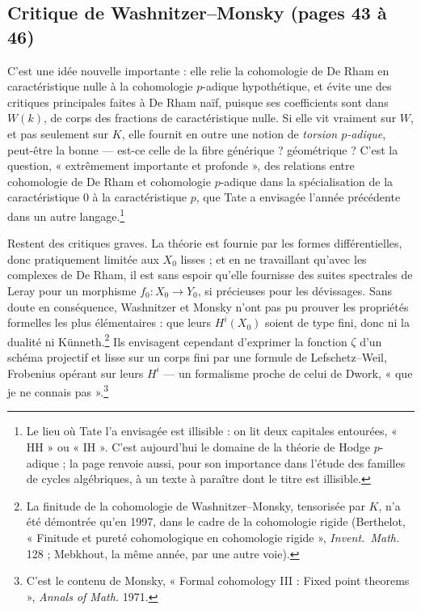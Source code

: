 \documentclass[11pt,a4paper]{article}
\begin{document}
\subsection*{Critique de Washnitzer--Monsky (pages 43 à 46)}

C'est une idée nouvelle importante : elle relie la cohomologie de De Rham en
caractéristique nulle à la cohomologie $p$-adique hypothétique, et évite une
des critiques principales faites à De Rham naïf, puisque ses coefficients
sont dans $W(k)$, de corps des fractions de caractéristique nulle. Si elle
vit vraiment sur $W$, et pas seulement sur $K$, elle fournit en outre une
notion de \emph{torsion $p$-adique}, peut-être la bonne — est-ce celle de la
fibre générique ? géométrique ? C'est la question, « extrêmement importante
et profonde », des relations entre cohomologie de De Rham et cohomologie
$p$-adique dans la spécialisation de la caractéristique $0$ à la
caractéristique $p$, que Tate a envisagée l'année précédente dans un autre
langage.\footnote{Le lieu où Tate l'a envisagée est illisible : on lit deux
capitales entourées, « HH » ou « IH ». C'est aujourd'hui le domaine de la
théorie de Hodge $p$-adique ; la page renvoie aussi, pour son importance dans
l'étude des familles de cycles algébriques, à un texte à paraître dont le
titre est illisible.}

Restent des critiques graves. La théorie est fournie par les formes
différentielles, donc pratiquement limitée aux $X_0$ lisses ; et en ne
travaillant qu'avec les complexes de De Rham, il est sans espoir qu'elle
fournisse des suites spectrales de Leray pour un morphisme $f_0 : X_0 \to
Y_0$, si précieuses pour les dévissages. Sans doute en conséquence,
Washnitzer et Monsky n'ont pas pu prouver les propriétés formelles les plus
élémentaires : que leurs $H^{i}(X_0)$ soient de type fini, donc ni la
dualité ni Künneth.\footnote{La finitude de la cohomologie de
Washnitzer--Monsky, tensorisée par $K$, n'a été démontrée qu'en 1997, dans le
cadre de la cohomologie rigide (Berthelot, « Finitude et pureté
cohomologique en cohomologie rigide », \emph{Invent.\ Math.} 128 ; Mebkhout,
la même année, par une autre voie).} Ils envisagent cependant d'exprimer la
fonction $\zeta$ d'un schéma projectif et lisse sur un corps fini par une
formule de Lefschetz--Weil, Frobenius opérant sur leurs $H^{i}$ — un
formalisme proche de celui de Dwork, « que je ne connais pas ».\footnote{C'est
le contenu de Monsky, « Formal cohomology III : Fixed point theorems »,
\emph{Annals of Math.} 1971.}
\end{document}
